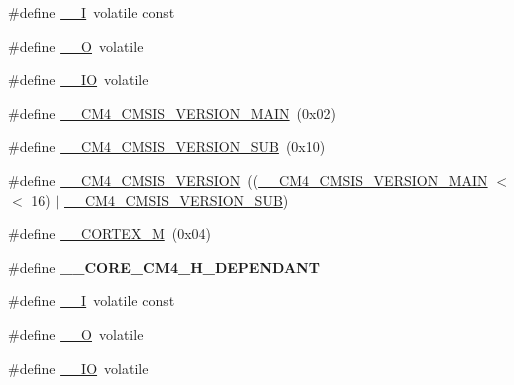 \begin{DoxyCompactItemize}
\item 
\#define \hyperlink{group___c_m_s_i_s__core__definitions_gaf63697ed9952cc71e1225efe205f6cd3}{\-\_\-\-\_\-\-I}~volatile const
\item 
\#define \hyperlink{group___c_m_s_i_s__core__definitions_ga7e25d9380f9ef903923964322e71f2f6}{\-\_\-\-\_\-\-O}~volatile
\item 
\#define \hyperlink{group___c_m_s_i_s__core__definitions_gaec43007d9998a0a0e01faede4133d6be}{\-\_\-\-\_\-\-I\-O}~volatile
\item 
\#define \hyperlink{group___c_m_s_i_s__core__definitions_ga90ffc8179476f80347379bfe29639edc}{\-\_\-\-\_\-\-C\-M4\-\_\-\-C\-M\-S\-I\-S\-\_\-\-V\-E\-R\-S\-I\-O\-N\-\_\-\-M\-A\-I\-N}~(0x02)
\item 
\#define \hyperlink{group___c_m_s_i_s__core__definitions_gafc7392964da961a44e916fcff7add532}{\-\_\-\-\_\-\-C\-M4\-\_\-\-C\-M\-S\-I\-S\-\_\-\-V\-E\-R\-S\-I\-O\-N\-\_\-\-S\-U\-B}~(0x10)
\item 
\#define \hyperlink{group___c_m_s_i_s__core__definitions_gacb6f5d2c3271c95d0a02fd06723af25d}{\-\_\-\-\_\-\-C\-M4\-\_\-\-C\-M\-S\-I\-S\-\_\-\-V\-E\-R\-S\-I\-O\-N}~((\hyperlink{group___c_m_s_i_s__core__definitions_ga90ffc8179476f80347379bfe29639edc}{\-\_\-\-\_\-\-C\-M4\-\_\-\-C\-M\-S\-I\-S\-\_\-\-V\-E\-R\-S\-I\-O\-N\-\_\-\-M\-A\-I\-N} $<$$<$ 16) $\vert$ \hyperlink{group___c_m_s_i_s__core__definitions_gafc7392964da961a44e916fcff7add532}{\-\_\-\-\_\-\-C\-M4\-\_\-\-C\-M\-S\-I\-S\-\_\-\-V\-E\-R\-S\-I\-O\-N\-\_\-\-S\-U\-B})
\item 
\#define \hyperlink{group___c_m_s_i_s__core__definitions_ga63ea62503c88acab19fcf3d5743009e3}{\-\_\-\-\_\-\-C\-O\-R\-T\-E\-X\-\_\-\-M}~(0x04)
\item 
\hypertarget{group___c_m_s_i_s__core__definitions_ga65104fb6a96df4ec7f7e72781b561060}{\#define {\bfseries \-\_\-\-\_\-\-C\-O\-R\-E\-\_\-\-C\-M4\-\_\-\-H\-\_\-\-D\-E\-P\-E\-N\-D\-A\-N\-T}}\label{group___c_m_s_i_s__core__definitions_ga65104fb6a96df4ec7f7e72781b561060}

\item 
\#define \hyperlink{group___c_m_s_i_s__core__definitions_gaf63697ed9952cc71e1225efe205f6cd3}{\-\_\-\-\_\-\-I}~volatile const
\item 
\#define \hyperlink{group___c_m_s_i_s__core__definitions_ga7e25d9380f9ef903923964322e71f2f6}{\-\_\-\-\_\-\-O}~volatile
\item 
\#define \hyperlink{group___c_m_s_i_s__core__definitions_gaec43007d9998a0a0e01faede4133d6be}{\-\_\-\-\_\-\-I\-O}~volatile
\end{DoxyCompactItemize}


